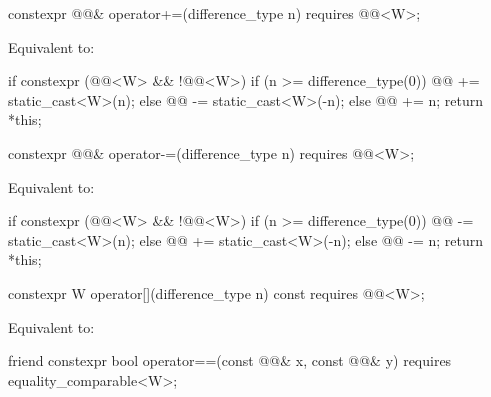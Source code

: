 \begin{itemdecl}
constexpr @@& operator+=(difference_type n)
  requires @@<W>;
\end{itemdecl}

\begin{itemdescr}
\pnum
\effects
Equivalent to:
\begin{codeblock}
if constexpr (@@<W> && !@@<W>) {
  if (n >= difference_type(0))
    @@ += static_cast<W>(n);
  else
    @@ -= static_cast<W>(-n);
} else {
  @@ += n;
}
return *this;
\end{codeblock}
\end{itemdescr}

\begin{itemdecl}
constexpr @@& operator-=(difference_type n)
  requires @@<W>;
\end{itemdecl}

\begin{itemdescr}
\pnum
\effects
Equivalent to:
\begin{codeblock}
if constexpr (@@<W> && !@@<W>) {
  if (n >= difference_type(0))
    @@ -= static_cast<W>(n);
  else
    @@ += static_cast<W>(-n);
} else {
  @@ -= n;
}
return *this;
\end{codeblock}
\end{itemdescr}

\begin{itemdecl}
constexpr W operator[](difference_type n) const
  requires @@<W>;
\end{itemdecl}

\begin{itemdescr}
\pnum
\effects
Equivalent to: 
\end{itemdescr}

\begin{itemdecl}
friend constexpr bool operator==(const @@& x, const @@& y)
  requires equality_comparable<W>;
\end{itemdecl}

